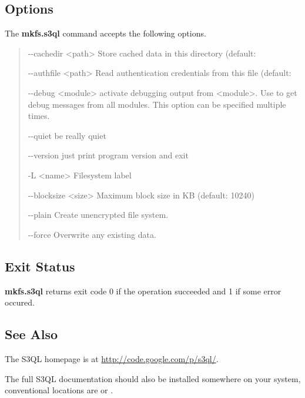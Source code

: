 \documentclass[letterpaper,10pt,english]{sphinxmanual}
\begin{document}
\subsection{Options}
\label{man/mkfs:options}
The \textbf{mkfs.s3ql} command accepts the following options.
\begin{quote}
\begin{optionlist}{3cm}
\item [-{-}cachedir \textless{}path\textgreater{}]  
Store cached data in this directory (default: 
\item [-{-}authfile \textless{}path\textgreater{}]  
Read authentication credentials from this file (default:
\item [-{-}debug \textless{}module\textgreater{}]  
activate debugging output from \textless{}module\textgreater{}. Use  to
get debug messages from all modules. This option can be
specified multiple times.
\item [-{-}quiet]  
be really quiet
\item [-{-}version]  
just print program version and exit
\item [-L \textless{}name\textgreater{}]  
Filesystem label
\item [-{-}blocksize \textless{}size\textgreater{}]  
Maximum block size in KB (default: 10240)
\item [-{-}plain]  
Create unencrypted file system.
\item [-{-}force]  
Overwrite any existing data.
\end{optionlist}
\end{quote}


\subsection{Exit Status}
\label{man/mkfs:exit-status}
\textbf{mkfs.s3ql} returns exit code 0 if the operation succeeded and 1 if some
error occured.


\subsection{See Also}
\label{man/mkfs:see-also}
The S3QL homepage is at \href{http://code.google.com/p/s3ql/}{http://code.google.com/p/s3ql/}.

The full S3QL documentation should also be installed somewhere on your
system, conventional locations are  or
.
\end{document}
